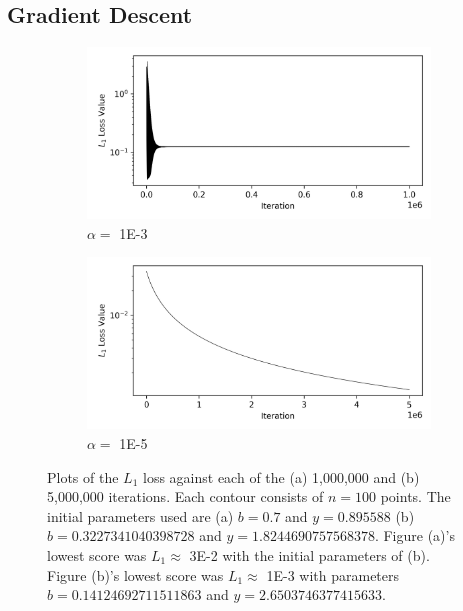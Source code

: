 \documentclass[a4paper]{report}
\begin{document}
\subsection{Gradient Descent}
\begin{figure}[H]
    \begin{subfigure}{.5\linewidth}
      \includegraphics[width=\linewidth]{images/gd/GD_loss_plot.png}
      \caption{$\alpha =$ 1E-3}
      \label{fig:gd_1e-3}
    \end{subfigure}\hfill
    \begin{subfigure}{.5\linewidth}
      \includegraphics[width=\linewidth]{images/gd/GD_loss_plot2.png}
      \caption{$\alpha =$ 1E-5}
      \label{fig:gd_1e-5}
    \end{subfigure}
    
    \caption{Plots of the $L_1$ loss against each of the (a) 1,000,000 and (b) 5,000,000 iterations. Each contour consists of $n = 100$ points. The initial parameters used are (a) $b = 0.7$ and $y = 0.895588$ (b) $b = 0.3227341040398728$ and $y = 1.8244690757568378$. Figure (a)'s lowest score was $L_1 \approx$ 3E-2 with the initial parameters of (b). Figure (b)'s lowest score was $L_1 \approx$ 1E-3 with parameters $b = 0.14124692711511863$ and $y = 2.6503746377415633$.}
    \label{fig:MAE_Abate_Whitt}
\end{figure}
\end{document}
